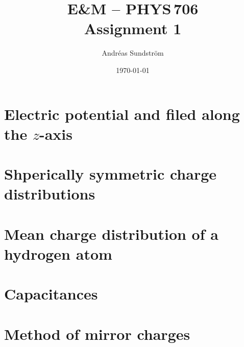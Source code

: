 \documentclass[11pt,letter, swedish, english
]{article}
\renewcommand{\thesubsection}{\arabic{section} (\alph{subsection})}
\begin{document}




\title{E\&M -- PHYS\,706 \\
Assignment 1}
\author{Andréas Sundström}
\date{\today}

\maketitle


\section{Electric potential and filed along the $z$-axis}



\section{Shperically symmetric charge distributions}
\renewcommand{\thesubsection}{\arabic{section} (\roman{subsection})}


\section{Mean charge distribution of a hydrogen atom}
\renewcommand{\thesubsection}{\arabic{section} (\alph{subsection})}


\section{Capacitances}



\section{Method of mirror charges}
\end{document}
